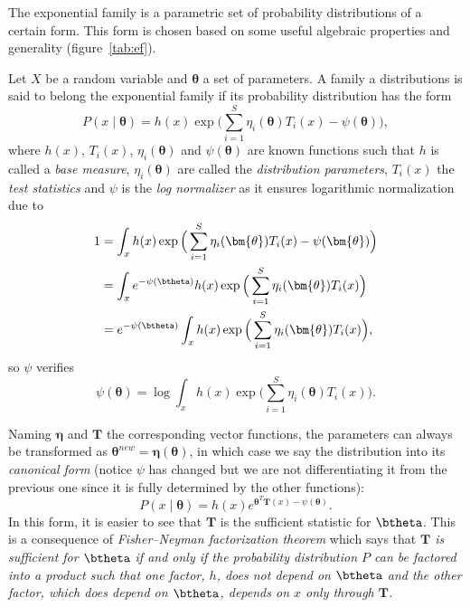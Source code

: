 
The exponential family is a parametric set of probability distributions of a certain form. This form is chosen based on some useful algebraic properties and generality (figure~\ref{tab:ef}).

Let \(X\) be a random variable and \(\bm{\theta}\) a set of parameters. A family a distributions is said to belong the exponential family if its probability distribution has the form
\[
  P(x \mid \bm{\theta}) = h(x)\exp{\Big( \sum_{i=1}^{S} \eta_{i}(\bm{\theta})T_{i}(x) - \psi(\bm{\theta}) \Big)},
\]
where \(h(x)\), \(T_{i}(x)\), \(\eta_{i}(\bm{\theta})\) and \(\psi(\bm{\theta})\)  are known functions such that \(h\) is called a \emph{base measure}, \(\eta_{i}(\bm{\theta})\) are called the \emph{distribution parameters},  \(T_{i}(x)\) the \emph{test statistics} and \(\psi\) is the \emph{log normalizer} as it ensures logarithmic normalization due to
\[
  \begin{aligned}
    1 &= \int_{x}  h(x)\exp{\Big( \sum_{i=1}^{S} \eta_{i}(\bm{\theta})T_{i}(x) - \psi(\bm{\theta}) \Big)}\\
    &= \int_{x} e^{-\psi(\btheta)} h(x)\exp{\Big( \sum_{i=1}^{S} \eta_{i}(\bm{\theta})T_{i}(x) \Big)}\\
    &= e^{-\psi(\btheta)} \int_{x} h(x)\exp{\Big( \sum_{i=1}^{S} \eta_{i}(\bm{\theta})T_{i}(x) \Big)},
  \end{aligned}
\]
so \(\psi\) verifies
\[
      \psi(\bm{\theta}) = \log \int_{x} h(x) \exp \Big( \sum_{i=1}^{S} \eta_{i}(\bm{\theta})T_{i}(x) \Big).
\]

Naming \(\bm{\eta}\) and \(\bm{T}\) the corresponding vector functions, the parameters can always be transformed as \(\bm{\theta}^{new} = \bm{\eta}(\bm{\theta})\), in which case we say the distribution into its \emph{canonical form} (notice \(\psi\) has changed but we are not differentiating it from the previous one since it is fully determined by the other functions):
\[
  P(x \mid \bm{\theta}) = h(x) e^{\bm{\theta}^{T}\bm{T}(x) - \psi(\bm{\theta})}.
\]
In this form, it is easier to see that \(\bm{T}\) is the sufficient statistic for \(\btheta\). This is a consequence of \emph{Fisher–Neyman factorization theorem} which says that \textit{\(\bm{T}\) is sufficient for \(\btheta\)  if and only if the probability distribution \(P\)  can be factored into a product such that one factor, \(h\), does not depend on \(\btheta\)  and the other factor, which does depend on \(\btheta\), depends on \(x\)  only through \(\bm{T}\).}

